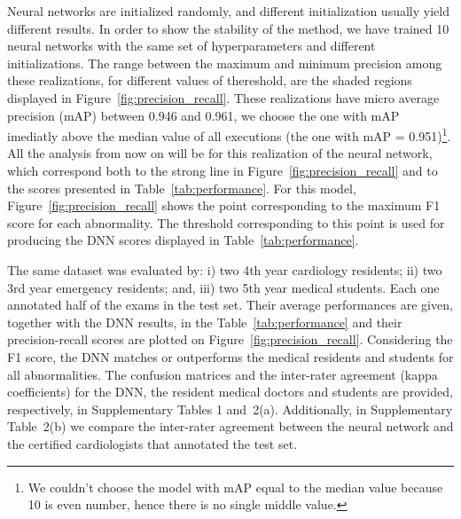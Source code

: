 \documentclass{article}
\begin{document}
Neural networks are initialized randomly, and different initialization usually yield different results. In order to show the stability of the method, we have trained 10 neural networks with the same set of hyperparameters and different initializations. The range between the maximum and minimum precision among these realizations, for different values of thereshold, are the shaded regions displayed in Figure~\ref{fig:precision_recall}. These realizations have micro average precision (mAP) between 0.946 and 0.961, we choose the one with mAP imediatly above the median value of all executions (the one with mAP = 0.951)\footnote{We couldn't choose the model with mAP equal to the median value because 10 is even number, hence there is no single middle value.}. All the analysis from now on will be for this realization of the neural network, which correspond both to the strong line in Figure~\ref{fig:precision_recall} and to the scores presented in Table~\ref{tab:performance}. For this model, Figure~\ref{fig:precision_recall} shows the point corresponding to the maximum F1 score for each abnormality. The threshold corresponding to this point is used for producing the DNN scores displayed in Table~\ref{tab:performance}.


The same dataset was evaluated by: i) two 4th year cardiology residents; ii) two 3rd year emergency residents; and, iii) two 5th year medical students. Each one annotated half of the exams in the test set. Their average performances are given, together with the DNN results, in the Table~\ref{tab:performance} and their precision-recall scores are plotted on Figure~\ref{fig:precision_recall}.  Considering the F1 score, the DNN matches or outperforms the medical residents and students for all abnormalities. The confusion matrices and the inter-rater agreement (kappa coefficients) for the DNN, the resident medical doctors and students are provided, respectively, in  Supplementary Tables 1 and~2(a). Additionally, in Supplementary Table~2(b) we compare the inter-rater agreement between the neural network and the certified cardiologists that annotated the test set.
\end{document}
